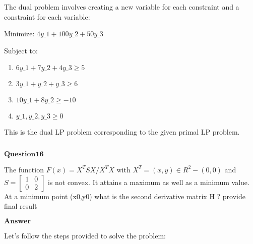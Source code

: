 \documentclass[11pt]{article}
\makeatletter
\providecommand{\tightlist}{%
      \setlength{\itemsep}{0pt}\setlength{\parskip}{0pt}}
\newcommand{\boxspacing}{\kern\kvtcb@left@rule\kern\kvtcb@boxsep}
\newcommand{\prompt}[4]{
        {\ttfamily\llap{{\color{#2}[#3]:\hspace{3pt}#4}}\vspace{-\baselineskip}}
    }
\makeatother
\begin{document}
The dual problem involves creating a new variable for each constraint
and a constraint for each variable:

Minimize: $ 4y\_1 + 100y\_2 + 50y\_3 $

Subject to:

\begin{enumerate}
\def\labelenumi{\arabic{enumi}.}
\tightlist
\item
  $ 6y\_1 + 7y\_2 + 4y\_3 \geq 5 $
\item
  $ 3y\_1 + y\_2 + y\_3 \geq 6 $
\item
  $ 10y\_1 + 8y\_2 \geq -10 $
\item
  $ y\_1, y\_2, y\_3 \geq 0 $
\end{enumerate}

This is the dual LP problem corresponding to the given primal LP
problem.

    \begin{tcolorbox}[breakable, size=fbox, boxrule=1pt, pad at break*=1mm,colback=cellbackground, colframe=cellborder]
\prompt{In}{incolor}{ }{\boxspacing}
\begin{Verbatim}[commandchars=\\\{\}]

\end{Verbatim}
\end{tcolorbox}

    $\textbf{Question16}$

The function $F(x)=X^TSX/X^TX$ with $X^T=(x,y)\in R^2-(0,0)$ and\\
$S=\begin{bmatrix} 1 & 0 \\ 0 & 2 \end{bmatrix}$ is not convex. It
attains a maximum as well as a minimum value.\\
At a minimum point (x0,y0) what is the second derivative matrix H ?
provide final result


$\textbf{Answer}$

    Let's follow the steps provided to solve the problem:
\end{document}
